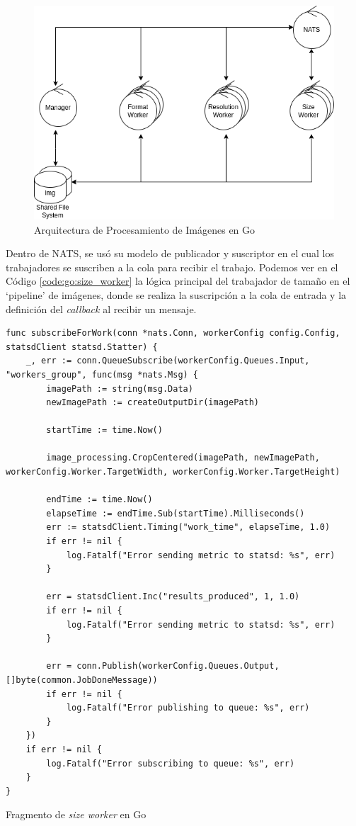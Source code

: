 \documentclass[11pt]{article}
\begin{document}
\begin{figure}[ht]
    \centering
    \includegraphics[scale=0.4]{resources/distributed_systems/go/image_processing_arch.png}
    \caption{Arquitectura de Procesamiento de Imágenes en Go}
    \label{fig:go:image_processing_arch}
\end{figure}

Dentro de NATS, se usó su modelo de publicador y suscriptor en el cual los trabajadores se suscriben a la cola para recibir el trabajo. Podemos ver en el Código \ref{code:go:size_worker} la lógica principal del trabajador de tamaño en el `pipeline' de imágenes, donde se realiza la suscripción a la cola de entrada y la definición del \textit{callback} al recibir un mensaje.

\begin{listing}[ht]
\begin{verbatim}
func subscribeForWork(conn *nats.Conn, workerConfig config.Config, statsdClient statsd.Statter) {
	_, err := conn.QueueSubscribe(workerConfig.Queues.Input, "workers_group", func(msg *nats.Msg) {
		imagePath := string(msg.Data)
		newImagePath := createOutputDir(imagePath)

		startTime := time.Now()

		image_processing.CropCentered(imagePath, newImagePath, workerConfig.Worker.TargetWidth, workerConfig.Worker.TargetHeight)

		endTime := time.Now()
		elapseTime := endTime.Sub(startTime).Milliseconds()
		err := statsdClient.Timing("work_time", elapseTime, 1.0)
		if err != nil {
			log.Fatalf("Error sending metric to statsd: %s", err)
		}

		err = statsdClient.Inc("results_produced", 1, 1.0)
		if err != nil {
			log.Fatalf("Error sending metric to statsd: %s", err)
		}

		err = conn.Publish(workerConfig.Queues.Output, []byte(common.JobDoneMessage))
		if err != nil {
			log.Fatalf("Error publishing to queue: %s", err)
		}
	})
	if err != nil {
		log.Fatalf("Error subscribing to queue: %s", err)
	}
}
\end{verbatim}
\caption{Fragmento de \textit{size worker} en Go}
\label{code:go:size_worker}
\end{listing}
\end{document}
